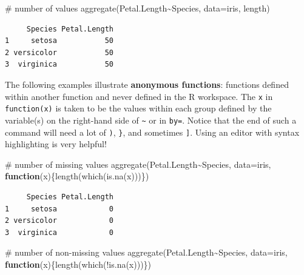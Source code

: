 \documentclass[
  13,
  letterpaper,
]{report}
\newenvironment{Shaded}{\begin{snugshade}}{\end{snugshade}}
\newcommand{\AttributeTok}[1]{\textcolor[rgb]{0.40,0.45,0.13}{#1}}
\newcommand{\CommentTok}[1]{\textcolor[rgb]{0.37,0.37,0.37}{#1}}
\newcommand{\ControlFlowTok}[1]{\textcolor[rgb]{0.00,0.23,0.31}{\textbf{#1}}}
\newcommand{\FunctionTok}[1]{\textcolor[rgb]{0.28,0.35,0.67}{#1}}
\newcommand{\NormalTok}[1]{\textcolor[rgb]{0.00,0.23,0.31}{#1}}
\newcommand{\SpecialCharTok}[1]{\textcolor[rgb]{0.37,0.37,0.37}{#1}}
\begin{document}
\begin{Shaded}
\begin{Highlighting}[]
\CommentTok{\# number of values}
\FunctionTok{aggregate}\NormalTok{(Petal.Length}\SpecialCharTok{\textasciitilde{}}\NormalTok{Species, }\AttributeTok{data=}\NormalTok{iris, length)}
\end{Highlighting}
\end{Shaded}

\begin{verbatim}
     Species Petal.Length
1     setosa           50
2 versicolor           50
3  virginica           50
\end{verbatim}

The following examples illustrate \textbf{anonymous functions}:
functions defined within another function and never defined in the R
workspace. The \texttt{x} in \texttt{function(x)} is taken to be the
values within each group defined by the variable(s) on the right-hand
side of \texttt{\textasciitilde{}} or in \texttt{by=}. Notice that the
end of such a command will need a lot of \texttt{)}, \texttt{\}}, and
sometimes \texttt{{]}}. Using an editor with syntax highlighting is very
helpful!

\begin{Shaded}
\begin{Highlighting}[]
\CommentTok{\# number of missing values}
\FunctionTok{aggregate}\NormalTok{(Petal.Length}\SpecialCharTok{\textasciitilde{}}\NormalTok{Species,}
          \AttributeTok{data=}\NormalTok{iris,}
          \ControlFlowTok{function}\NormalTok{(x)\{}\FunctionTok{length}\NormalTok{(}\FunctionTok{which}\NormalTok{(}\FunctionTok{is.na}\NormalTok{(x)))\})}
\end{Highlighting}
\end{Shaded}

\begin{verbatim}
     Species Petal.Length
1     setosa            0
2 versicolor            0
3  virginica            0
\end{verbatim}

\begin{Shaded}
\begin{Highlighting}[]
\CommentTok{\# number of non{-}missing values}
\FunctionTok{aggregate}\NormalTok{(Petal.Length}\SpecialCharTok{\textasciitilde{}}\NormalTok{Species, }
          \AttributeTok{data=}\NormalTok{iris,}
          \ControlFlowTok{function}\NormalTok{(x)\{}\FunctionTok{length}\NormalTok{(}\FunctionTok{which}\NormalTok{(}\SpecialCharTok{!}\FunctionTok{is.na}\NormalTok{(x)))\})}
\end{Highlighting}
\end{Shaded}
\end{document}
